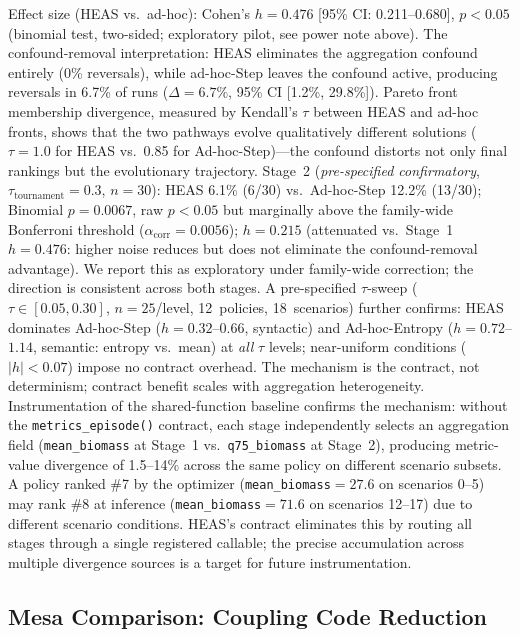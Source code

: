 \documentclass{wscpaperproc}
\begin{document}
Effect size (HEAS vs.\ ad-hoc): Cohen's $h = 0.476$ [95\% CI: 0.211--0.680],
$p < 0.05$ (binomial test, two-sided; exploratory pilot, see power note above).
The confound-removal interpretation: HEAS eliminates the aggregation confound
entirely (0\% reversals), while ad-hoc-Step leaves the confound active, producing
reversals in 6.7\% of runs ($\Delta = 6.7\%$, 95\% CI [1.2\%, 29.8\%]). Pareto
front membership divergence, measured by Kendall's $\tau$ between HEAS and
ad-hoc fronts, shows that the two pathways evolve qualitatively different
solutions ($\tau = 1.0$ for HEAS vs.\ 0.85 for Ad-hoc-Step)---the confound
distorts not only final rankings but the evolutionary trajectory. Stage~2
(\emph{pre-specified confirmatory}, $\tau_\text{tournament}\!=\!0.3$,
$n\!=\!30$): HEAS 6.1\% (6/30) vs.\ Ad-hoc-Step 12.2\% (13/30); Binomial
$p\!=\!0.0067$, raw $p < 0.05$ but marginally above the family-wide Bonferroni
threshold ($\alpha_{\text{corr}}\!=\!0.0056$); $h\!=\!0.215$ (attenuated vs.\
Stage~1 $h\!=\!0.476$: higher noise reduces but does not eliminate the
confound-removal advantage). We report this as exploratory under family-wide
correction; the direction is consistent across both stages. A pre-specified $\tau$-sweep ($\tau \in [0.05,
0.30]$, $n\!=\!25$/level, 12~policies, 18~scenarios) further confirms: HEAS dominates
Ad-hoc-Step ($h\!=\!0.32$--$0.66$, syntactic) and Ad-hoc-Entropy ($h\!=\!0.72$--$1.14$,
semantic: entropy vs.\ mean) at \emph{all} $\tau$ levels; near-uniform conditions
($|h|\!<\!0.07$) impose no contract overhead. The mechanism is the contract, not
determinism; contract benefit scales with aggregation heterogeneity.
Instrumentation of the shared-function baseline confirms the mechanism:
without the \texttt{metrics\_episode()} contract, each stage independently
selects an aggregation field (\texttt{mean\_biomass} at Stage~1 vs.\
\texttt{q75\_biomass} at Stage~2), producing metric-value divergence of
1.5--14\% across the same policy on different scenario subsets. A policy
ranked \#7 by the optimizer (\texttt{mean\_biomass}$\!=\!27.6$ on
scenarios 0--5) may rank \#8 at inference (\texttt{mean\_biomass}$\!=\!71.6$
on scenarios 12--17) due to different scenario conditions. HEAS's
contract eliminates this by routing all stages through a single registered
callable; the precise accumulation across multiple divergence sources is
a target for future instrumentation.

\subsection{Mesa Comparison: Coupling Code Reduction}
\label{sec:mesa-comparison}
\end{document}
